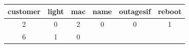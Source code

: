 \documentclass[]{article}
\begin{document}
\begin{longtable}[c]{@{}cccccc@{}}
\toprule
\begin{minipage}[b]{0.13\columnwidth}\centering\strut
customer
\strut\end{minipage} &
\begin{minipage}[b]{0.09\columnwidth}\centering\strut
light
\strut\end{minipage} &
\begin{minipage}[b]{0.07\columnwidth}\centering\strut
mac
\strut\end{minipage} &
\begin{minipage}[b]{0.08\columnwidth}\centering\strut
name
\strut\end{minipage} &
\begin{minipage}[b]{0.14\columnwidth}\centering\strut
outagesif
\strut\end{minipage} &
\begin{minipage}[b]{0.09\columnwidth}\centering\strut
reboot
\strut\end{minipage}\tabularnewline
\midrule
\endhead
\begin{minipage}[t]{0.13\columnwidth}\centering\strut
2
\strut\end{minipage} &
\begin{minipage}[t]{0.09\columnwidth}\centering\strut
0
\strut\end{minipage} &
\begin{minipage}[t]{0.07\columnwidth}\centering\strut
2
\strut\end{minipage} &
\begin{minipage}[t]{0.08\columnwidth}\centering\strut
0
\strut\end{minipage} &
\begin{minipage}[t]{0.14\columnwidth}\centering\strut
0
\strut\end{minipage} &
\begin{minipage}[t]{0.09\columnwidth}\centering\strut
1
\strut\end{minipage}\tabularnewline
\begin{minipage}[t]{0.13\columnwidth}\centering\strut
6
\strut\end{minipage} &
\begin{minipage}[t]{0.09\columnwidth}\centering\strut
1
\strut\end{minipage} &
\begin{minipage}[t]{0.07\columnwidth}\centering\strut
0
\strut\end{minipage} &
\begin{minipage}[t]{0.08\columnwidth}\centering\strut

\end{minipage}
\end{longtable}
\end{document}
